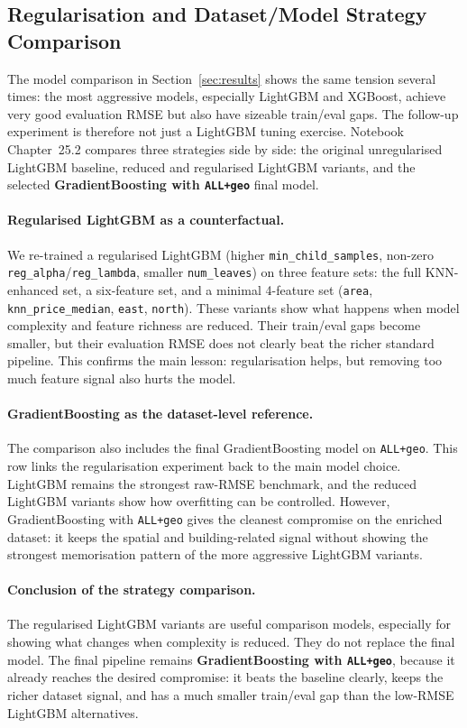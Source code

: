 \documentclass[11pt,a4paper]{article}
\begin{document}
\subsection{Regularisation and Dataset/Model Strategy Comparison}
\label{sec:regularised}
The model comparison in Section~\ref{sec:results} shows the same tension several times: the most aggressive models, especially LightGBM and XGBoost, achieve very good evaluation RMSE but also have sizeable train/eval gaps. The follow-up experiment is therefore not just a LightGBM tuning exercise. Notebook Chapter~25.2 compares three strategies side by side: the original unregularised LightGBM baseline, reduced and regularised LightGBM variants, and the selected \textbf{GradientBoosting with \texttt{ALL+geo}} final model.

\paragraph{Regularised LightGBM as a counterfactual.}
We re-trained a regularised LightGBM (higher \texttt{min\_child\_samples}, non-zero \texttt{reg\_alpha}/\texttt{reg\_lambda}, smaller \texttt{num\_leaves}) on three feature sets: the full KNN-enhanced set, a six-feature set, and a minimal 4-feature set (\texttt{area}, \texttt{knn\_price\_median}, \texttt{east}, \texttt{north}). These variants show what happens when model complexity and feature richness are reduced. Their train/eval gaps become smaller, but their evaluation RMSE does not clearly beat the richer standard pipeline. This confirms the main lesson: regularisation helps, but removing too much feature signal also hurts the model.

\paragraph{GradientBoosting as the dataset-level reference.}
The comparison also includes the final GradientBoosting model on \texttt{ALL+geo}. This row links the regularisation experiment back to the main model choice. LightGBM remains the strongest raw-RMSE benchmark, and the reduced LightGBM variants show how overfitting can be controlled. However, GradientBoosting with \texttt{ALL+geo} gives the cleanest compromise on the enriched dataset: it keeps the spatial and building-related signal without showing the strongest memorisation pattern of the more aggressive LightGBM variants.

\paragraph{Conclusion of the strategy comparison.}
The regularised LightGBM variants are useful comparison models, especially for showing what changes when complexity is reduced. They do not replace the final model. The final pipeline remains \textbf{GradientBoosting with \texttt{ALL+geo}}, because it already reaches the desired compromise: it beats the baseline clearly, keeps the richer dataset signal, and has a much smaller train/eval gap than the low-RMSE LightGBM alternatives.
\end{document}
